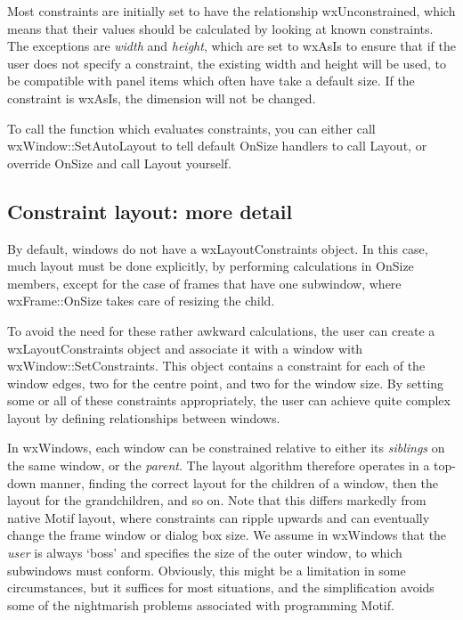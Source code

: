 Most constraints are initially set to have the relationship wxUnconstrained,
which means that their values should be calculated by looking at known constraints.
The exceptions are {\it width} and {\it height}, which are set to wxAsIs to
ensure that if the user does not specify a constraint, the existing
width and height will be used, to be compatible with panel items which often
have take a default size. If the constraint is wxAsIs, the dimension will
not be changed.

To call the  function which evaluates
constraints, you can either call wxWindow::SetAutoLayout to tell
default OnSize handlers to call Layout, or override OnSize and call Layout yourself.

\subsection{Constraint layout: more detail}

By default, windows do not have a wxLayoutConstraints object. In this case, much layout
must be done explicitly, by performing calculations in OnSize members, except
for the case of frames that have one subwindow, where wxFrame::OnSize takes care
of resizing the child.

To avoid the need for these rather awkward calculations, the user can create
a wxLayoutConstraints object and associate it with a window with wxWindow::SetConstraints.
This object contains a constraint for each of the window edges, two for the centre point,
and two for the window size. By setting some or all of these constraints appropriately,
the user can achieve quite complex layout by defining relationships between windows.

In wxWindows, each window can be constrained relative to either its {\it
siblings} on the same window, or the {\it parent}. The layout algorithm
therefore operates in a top-down manner, finding the correct layout for
the children of a window, then the layout for the grandchildren, and so
on. Note that this differs markedly from native Motif layout, where
constraints can ripple upwards and can eventually change the frame
window or dialog box size. We assume in wxWindows that the {\it user} is
always `boss' and specifies the size of the outer window, to which
subwindows must conform. Obviously, this might be a limitation in some
circumstances, but it suffices for most situations, and the
simplification avoids some of the nightmarish problems associated with
programming Motif.


